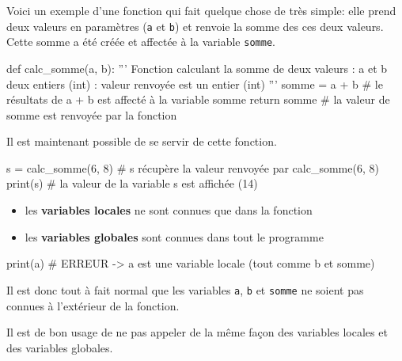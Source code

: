 \begin{exemple}{}
	Voici un exemple d'une fonction qui fait quelque chose de très simple: elle prend deux valeurs en paramètres (\texttt{a} et \texttt{b}) et renvoie la somme des ces deux valeurs. Cette somme a été créée et affectée à la variable \texttt{somme}.
	
	\begin{CodePythontexAlt}[TaillePolice=\normalsize, Largeur=1\linewidth,Centre,Lignes=true,PremLigne=1]{}
def calc_somme(a, b):
	''' Fonction calculant la somme de deux valeurs 
	: a et b deux entiers (int)					
	: valeur renvoyée est un entier (int) '''
	somme = a + b      # le résultats de a + b est affecté à la variable somme
	return somme       # la valeur de somme est renvoyée par la fonction
\end{CodePythontexAlt}

	Il est maintenant possible de se servir de cette fonction.


	\begin{CodePythontexAlt}[TaillePolice=\normalsize, Largeur=1\linewidth,Centre,PremLigne=1, Lignes=false,]{}
s = calc_somme(6, 8)	# s récupère la valeur renvoyée par calc_somme(6, 8)
print(s)            	# la valeur de la variable s est affichée (14)
\end{CodePythontexAlt}
\end{exemple}


\begin{remarque}
	
	\begin{itemize}
		\item les \textbf{variables locales} ne sont connues que dans la fonction
		\item les \textbf{variables globales} sont connues dans tout le programme
	\end{itemize}

	\begin{CodePythontexAlt}[TaillePolice=\normalsize, Largeur=1\linewidth,Centre,PremLigne=1, Lignes=false,]{}
print(a)   # ERREUR -> a est une variable locale (tout comme b et somme)
\end{CodePythontexAlt}

Il est donc tout à fait normal que les variables \verb+a+, \verb+b+ et \verb+somme+ ne soient pas connues à l'extérieur de la fonction.

Il est de bon usage de ne pas appeler de la même façon des variables locales et des variables globales.


\end{remarque}

